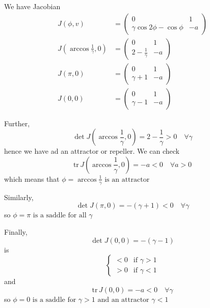 \documentclass[12pt]{article}
\newcommand{\tr}{\text{tr}\,}
\begin{document}
\begin{enumerate}[(i)]
          We have Jacobian
          \begin{align*}
              J(\phi, v)                     & = \begin{pmatrix}
                                                     0                             & 1  \\
                                                     \gamma \cos 2\phi - \cos \phi & -a
                                                 \end{pmatrix} \\
              J(\arccos \frac{1}{\gamma}, 0) & = \begin{pmatrix}
                                                     0                    & 1  \\
                                                     2 - \frac{1}{\gamma} & -a
                                                 \end{pmatrix}          \\
              J(\pi, 0)                      & = \begin{pmatrix}
                                                     0          & 1  \\
                                                     \gamma + 1 & -a
                                                 \end{pmatrix}                    \\
              J(0, 0)                        & = \begin{pmatrix}
                                                     0          & 1  \\
                                                     \gamma - 1 & -a
                                                 \end{pmatrix}
          \end{align*}

          Further,
          \[\det J(\arccos \frac{1}{\gamma}, 0)  = 2 - \frac{1}{\gamma} > 0 \quad \forall \gamma\]
          hence we have ad an attractor or repeller. We can check
          \[\tr J(\arccos \frac{1}{\gamma}, 0) = -a < 0 \quad \forall a > 0\]
          which means that $\boxed{\phi = \arccos \frac{1}{\gamma}\text{ is an attractor}}$

          Similarly,
          \[\det J(\pi, 0) = -(\gamma + 1) < 0 \quad \forall \gamma\]
          so $\boxed{\phi = \pi\text{ is a saddle for all }\gamma}$

          Finally,
          \[\det J(0, 0) = -(\gamma - 1)\]
          is
          \[\begin{cases}
                  < 0 & \text{if } \gamma > 1 \\
                  > 0 & \text{if } \gamma < 1
              \end{cases}\]
          and
          \[\tr J(0, 0) = -a < 0 \quad \forall \gamma\]
          so $\boxed{\phi = 0\text{ is a saddle for } \gamma > 1\text{ and an attractor } \gamma < 1 }$


\end{enumerate}
\end{document}
